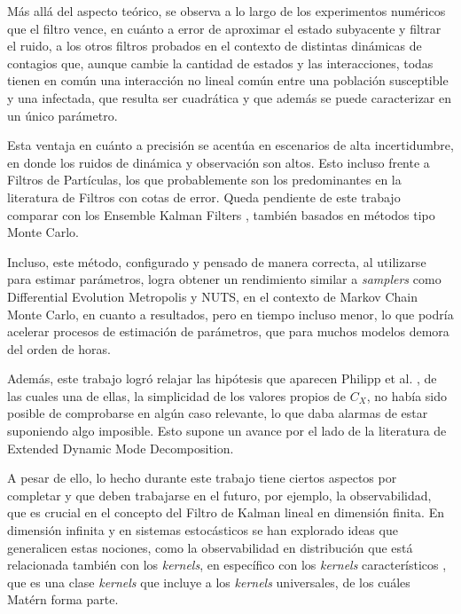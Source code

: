 Más allá del aspecto teórico, se observa a lo largo de los experimentos numéricos que el filtro vence, en cuánto a error de aproximar el estado subyacente y filtrar el ruido, a los otros filtros probados en el contexto de distintas dinámicas de contagios que, aunque cambie la cantidad de estados y las interacciones, todas tienen en común una interacción no lineal común entre una población susceptible y una infectada, que resulta ser cuadrática y que además se puede caracterizar en un único parámetro.

Esta ventaja en cuánto a precisión se acentúa en escenarios de alta incertidumbre, en donde los ruidos de dinámica y observación son altos. Esto incluso frente a Filtros de Partículas, los que probablemente son los predominantes en la literatura de Filtros con cotas de error. Queda pendiente de este trabajo comparar con los Ensemble Kalman Filters \cite{Evensen1994SequentialStatistics}, también basados en métodos tipo Monte Carlo.

Incluso, este método, configurado y pensado de manera correcta, al utilizarse para estimar parámetros, logra obtener un rendimiento similar a \textit{samplers} como Differential Evolution Metropolis y NUTS, en el contexto de Markov Chain Monte Carlo, en cuanto a resultados, pero en tiempo incluso menor, lo que podría acelerar procesos de estimación de parámetros, que para muchos modelos demora del orden de horas.

Además, este trabajo logró relajar las hipótesis que aparecen Philipp et al. \cite{Philipp2024ErrorOperator}, de las cuales una de ellas, la simplicidad de los valores propios de $C_X$, no había sido posible de comprobarse en algún caso relevante, lo que daba alarmas de estar suponiendo algo imposible. Esto supone un avance por el lado de la literatura de Extended Dynamic Mode Decomposition.

A pesar de ello, lo hecho durante este trabajo tiene ciertos aspectos por completar y que deben trabajarse en el futuro, por ejemplo, la observabilidad, que es crucial en el concepto del Filtro de Kalman lineal en dimensión finita. En dimensión infinita y en sistemas estocásticos se han explorado ideas que generalicen estas nociones, como la observabilidad en distribución \cite{Massiani2024Data-DrivenSystems} que está relacionada también con los \textit{kernels}, en específico con los \textit{kernels} característicos \cite{Sriperumbudur2010OnMeasures, Sriperumbudur2011UniversalityMeasures}, que es una clase \textit{kernels} que incluye a los \textit{kernels} universales, de los cuáles Matérn forma parte.

